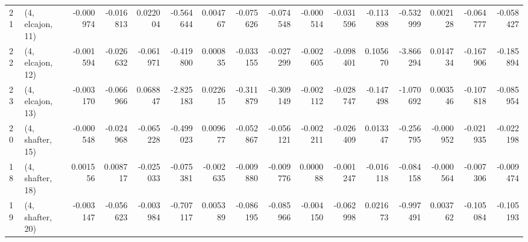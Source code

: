 \begin{tabular}{llrrrrrrrrrrrrrr}
21 &  (4, elcajon, 11) &  -0.000974 & -0.016813 &  0.022004 &  -0.564644 &  0.004767 &  -0.075626 & -0.074548 & -0.000514 & -0.031596 & -0.113898 &  -0.532999 &  0.002128 & -0.064777 & -0.058427 \\
22 &  (4, elcajon, 12) &  -0.001594 & -0.026632 & -0.061971 &  -0.419800 &  0.000835 &  -0.033155 & -0.027299 & -0.002605 & -0.098401 &  0.105670 &  -3.866294 &  0.014734 & -0.167906 & -0.185894 \\
23 &  (4, elcajon, 13) &  -0.003170 & -0.066966 &  0.068847 &  -2.825183 &  0.022615 &  -0.311879 & -0.309149 & -0.002112 & -0.028747 & -0.147498 &  -1.070692 &  0.003546 & -0.107818 & -0.085954 \\
20 &  (4, shafter, 15) &  -0.000548 & -0.024968 & -0.065228 &  -0.499023 &  0.009677 &  -0.052867 & -0.056121 & -0.002211 & -0.026409 &  0.013347 &  -0.256795 & -0.000952 & -0.021935 & -0.022198 \\
18 &  (4, shafter, 18) &   0.001556 &  0.008717 & -0.025033 &  -0.075381 & -0.002635 &  -0.009880 & -0.009776 &  0.000088 & -0.001247 & -0.016118 &  -0.084158 & -0.000564 & -0.007306 & -0.009474 \\
19 &  (4, shafter, 20) &  -0.003147 & -0.056623 & -0.003984 &  -0.707117 &  0.005389 &  -0.086195 & -0.085966 & -0.004150 & -0.062998 &  0.021673 &  -0.997491 &  0.003762 & -0.105084 & -0.105193 \\
\bottomrule
\end{tabular}
